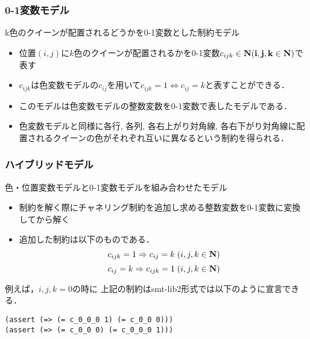 \begin{frame}\small
    \frametitle{0-1変数モデル}
    \alert{k色のクイーンが配置されるどうか}を0-1変数とした制約モデル\\
    \setlength{\abovedisplayskip}{1pt} %
    \setlength{\belowdisplayskip}{1pt} %
    \begin{block}{}
        \begin{itemize}
            \item 位置$(i, j)$に$k$色のクイーンが配置されるかを0-1変数$c_{ijk} \in \bf N (i, j, k \in \bf N)$で表す
            \item $c_{ijk}$は色変数モデルの$c_{ij}$を用いて$c_{ijk}=1 \Leftrightarrow c_{ij}=k$と表すことができる．
            \item このモデルは色変数モデルの整数変数を0-1変数で表したモデルである．
            \item 色変数モデルと同様に\alert{各行}, \alert{各列}, \alert{各右上がり対角線}, \alert{各右下がり対角線}に配置されるクイーンの色がそれぞれ互いに異なるという制約を得られる．
        \end{itemize}
    \end{block}
\end{frame}


\begin{frame}[fragile]\small
    \frametitle{ハイブリッドモデル}
    色・位置変数モデルと0-1変数モデルを組み合わせたモデル\\
    \setlength{\abovedisplayskip}{1pt} %
    \setlength{\belowdisplayskip}{1pt} %
    \begin{block}{}
        \begin{itemize}
            \item \distinct 制約を解く際にチャネリング制約を追加し求める整数変数を0-1変数に変換してから解く
            \item 追加した制約は以下のものである．
                $$ c_{ijk}=1 \Rightarrow c_{ij}=k \; (i,j,k \in \bf N)$$
                $$ c_{ij}=k \Rightarrow c_{ijk}=1 \; (i,j,k \in \bf N)$$
        \end{itemize}
    \end{block}
    例えば，$i,j,k=0$の時に
    上記の制約はsmt-lib2形式では以下のように宣言できる．
    \begin{exampleblock}{}
\begin{verbatim}
(assert (=> (= c_0_0_0 1) (= c_0_0 0)))
(assert (=> (= c_0_0 0) (= c_0_0_0 1)))
\end{verbatim}
    \end{exampleblock}
\end{frame}


